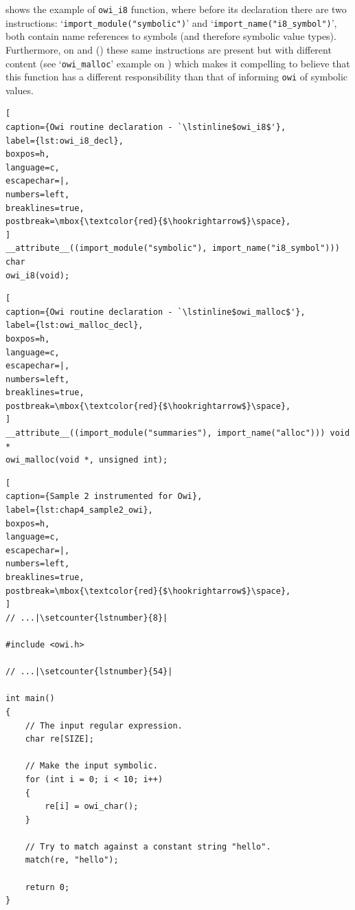  shows the example of \lstinline$owi_i8$ function, where before its declaration there are two instructions: `\lstinline$import_module("symbolic")$' and `\lstinline$import_name("i8_symbol")$', both contain name references to symbols (and therefore symbolic value types). Furthermore, on  and  () these same instructions are present but with different content (see `\lstinline$owi_malloc$' example on ) which makes it compelling to believe that this function has a different responsibility than that of informing \lstinline$owi$ of symbolic values.
\begin{lstlisting}[
caption={Owi routine declaration - `\lstinline$owi_i8$'},
label={lst:owi_i8_decl},
boxpos=h,
language=c,
escapechar=|,
numbers=left,
breaklines=true,
postbreak=\mbox{\textcolor{red}{$\hookrightarrow$}\space},
]
__attribute__((import_module("symbolic"), import_name("i8_symbol"))) char
owi_i8(void);
\end{lstlisting}

\begin{lstlisting}[
caption={Owi routine declaration - `\lstinline$owi_malloc$'},
label={lst:owi_malloc_decl},
boxpos=h,
language=c,
escapechar=|,
numbers=left,
breaklines=true,
postbreak=\mbox{\textcolor{red}{$\hookrightarrow$}\space},
]
__attribute__((import_module("summaries"), import_name("alloc"))) void *
owi_malloc(void *, unsigned int);
\end{lstlisting}

\begin{lstlisting}[
caption={Sample 2 instrumented for Owi},
label={lst:chap4_sample2_owi},
boxpos=h,
language=c,
escapechar=|,
numbers=left,
breaklines=true,
postbreak=\mbox{\textcolor{red}{$\hookrightarrow$}\space},
]
// ...|\setcounter{lstnumber}{8}|

#include <owi.h>

// ...|\setcounter{lstnumber}{54}|

int main()
{
	// The input regular expression.
	char re[SIZE];

	// Make the input symbolic.
	for (int i = 0; i < 10; i++)
	{
		re[i] = owi_char();
	}

	// Try to match against a constant string "hello".
	match(re, "hello");

	return 0;
}
\end{lstlisting}


